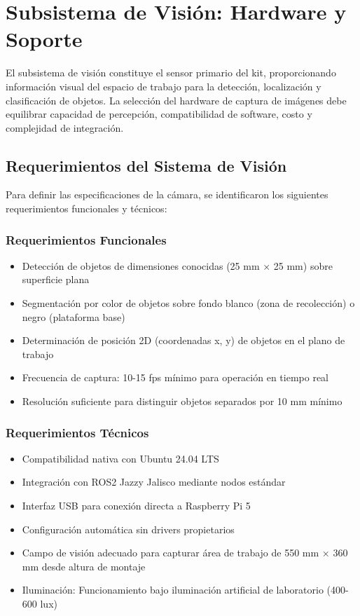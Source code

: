 \section{Subsistema de Visión: Hardware y Soporte}

El subsistema de visión constituye el sensor primario del kit, proporcionando información visual del espacio de trabajo para la detección, localización y clasificación de objetos. La selección del hardware de captura de imágenes debe equilibrar capacidad de percepción, compatibilidad de software, costo y complejidad de integración.

\subsection{Requerimientos del Sistema de Visión}

Para definir las especificaciones de la cámara, se identificaron los siguientes requerimientos funcionales y técnicos:

\subsubsection{Requerimientos Funcionales}

\begin{itemize}
    \item Detección de objetos de dimensiones conocidas (25 mm × 25 mm) sobre superficie plana
    \item Segmentación por color de objetos sobre fondo blanco (zona de recolección) o negro (plataforma base)
    \item Determinación de posición 2D (coordenadas x, y) de objetos en el plano de trabajo
    \item Frecuencia de captura: 10-15 fps mínimo para operación en tiempo real
    \item Resolución suficiente para distinguir objetos separados por 10 mm mínimo
\end{itemize}

\subsubsection{Requerimientos Técnicos}

\begin{itemize}
    \item Compatibilidad nativa con Ubuntu 24.04 LTS
    \item Integración con ROS2 Jazzy Jalisco mediante nodos estándar
    \item Interfaz USB para conexión directa a Raspberry Pi 5
    \item Configuración automática sin drivers propietarios
    \item Campo de visión adecuado para capturar área de trabajo de 550 mm × 360 mm desde altura de montaje
    \item Iluminación: Funcionamiento bajo iluminación artificial de laboratorio (400-600 lux)
\end{itemize}

